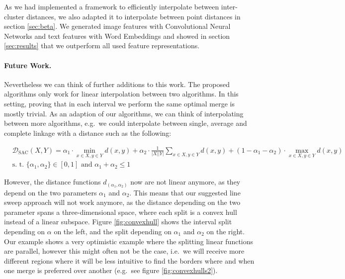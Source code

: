 As we had implemented a framework to efficiently interpolate between inter-cluster distances, we also adapted it to interpolate between point distances in section \ref{sec:beta}. We generated image features with Convolutional Neural Networks and text features with Word Embeddings and showed in section \ref{sec:results} that we outperform all used feature representations.

\paragraph{Future Work.} Nevertheless we can think of further additions to this work. The proposed algorithms only work for linear interpolation between two algorithms. In this setting, proving that in each interval we perform the same optimal merge is mostly trivial. As an adaption of our algorithms, we can think of interpolating between more algorithms, e.g.\ we could interpolate between single, average and complete linkage with a distance such as the following:

\begin{align*}
&\mathcal{D}_\text{SAC}(X,Y) = \alpha_1 \cdot \min\limits_{x \in X, y \in Y} d(x,y) + \alpha_2 \cdot \frac{1}{|X||Y|} \sum\limits_{x \in X, y \in Y} d(x,y) + (1-\alpha_1-\alpha_2) \cdot \max\limits_{x \in X, y \in Y} d(x,y)\\
&\text{s. t. } \{\alpha_1, \alpha_2\} \in [0,1] \text{ and } \alpha_1 + \alpha_2 \le 1
\end{align*}

However, the distance functions $d_{(\alpha_1, \alpha_2)}$ now are not linear anymore, as they depend on the two parameters $\alpha_1$ and $\alpha_2$. This means that our suggested line sweep approach will not work anymore, as the distance depending on the two parameter spans a three-dimensional space, where each split is a convex hull instead of a linear subspace. Figure \ref{fig:convexhull} shows the interval split depending on $\alpha$ on the left, and the split depending on $\alpha_1$ and $\alpha_2$ on the right. Our example shows a very optimistic example where the splitting linear functions are parallel, however this might often not be the case, i.e.\ we will receive more different regions where it will be less intuitive to find the borders where and when one merge is preferred over another (e.g.\ see figure \ref{fig:convexhulls2}).

